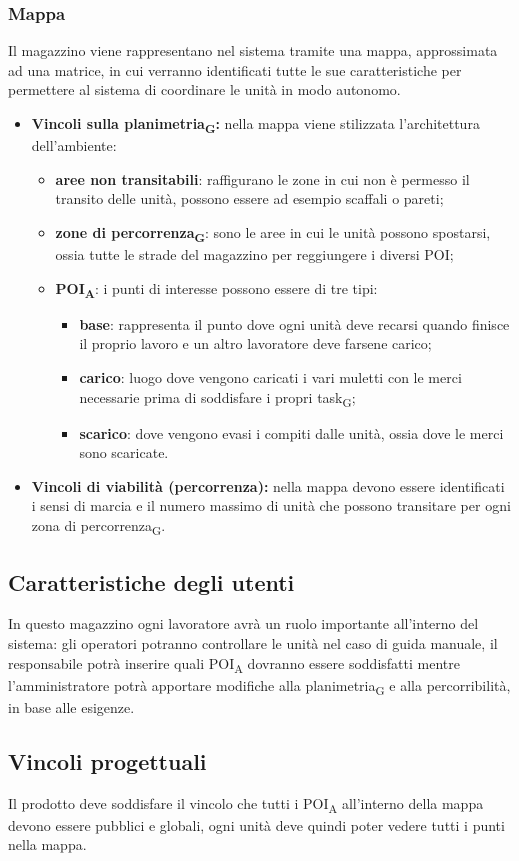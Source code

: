 \subsubsection{Mappa}
Il magazzino viene rappresentano nel sistema tramite una mappa, approssimata ad una matrice, in cui verranno identificati tutte le sue caratteristiche per permettere al sistema di coordinare le unità in modo autonomo.
\begin{itemize}
	\item \textbf{Vincoli sulla \gls{planimetria}\textsubscript{G}:} nella mappa viene stilizzata l'architettura dell'ambiente:
	\begin{itemize}
		\item \textbf{aree non transitabili}: raffigurano le zone in cui non è permesso il transito delle unità, possono essere ad esempio scaffali o pareti;
		\item \textbf{zone di \gls{percorrenza}\textsubscript{G}}: sono le aree in cui le unità possono spostarsi, ossia tutte le strade del magazzino per reggiungere i diversi POI;
		\item \textbf{\acrshort{POI}\textsubscript{A}}: i punti di interesse possono essere di tre tipi:
		\begin{itemize}
			\item \textbf{base}: rappresenta il punto dove ogni unità deve recarsi quando finisce il proprio lavoro e un altro lavoratore deve farsene carico;
			\item \textbf{carico}: luogo dove vengono caricati i vari muletti con le merci necessarie prima di soddisfare i propri \gls{task}\textsubscript{G};
			\item \textbf{scarico}: dove vengono evasi i compiti dalle unità, ossia dove le merci sono scaricate.
		\end{itemize}
	\end{itemize}
	\item \textbf{Vincoli di viabilità (percorrenza):} nella mappa devono essere identificati i sensi di marcia e il numero massimo di unità che possono transitare per ogni zona di \gls{percorrenza}\textsubscript{G}.
	
\end{itemize}

\subsection{Caratteristiche degli utenti}
In questo magazzino ogni lavoratore avrà un ruolo importante all'interno del sistema: gli operatori potranno controllare le unità nel caso di guida manuale, il responsabile potrà inserire quali \acrshort{POI}\textsubscript{A} dovranno essere soddisfatti mentre l'amministratore potrà apportare modifiche alla \gls{planimetria}\textsubscript{G} e alla percorribilità, in base alle esigenze.
\subsection{Vincoli progettuali}
Il prodotto deve soddisfare il vincolo che tutti i \acrshort{POI}\textsubscript{A} all'interno della mappa devono essere pubblici e globali, ogni unità deve quindi poter vedere tutti i punti nella mappa.